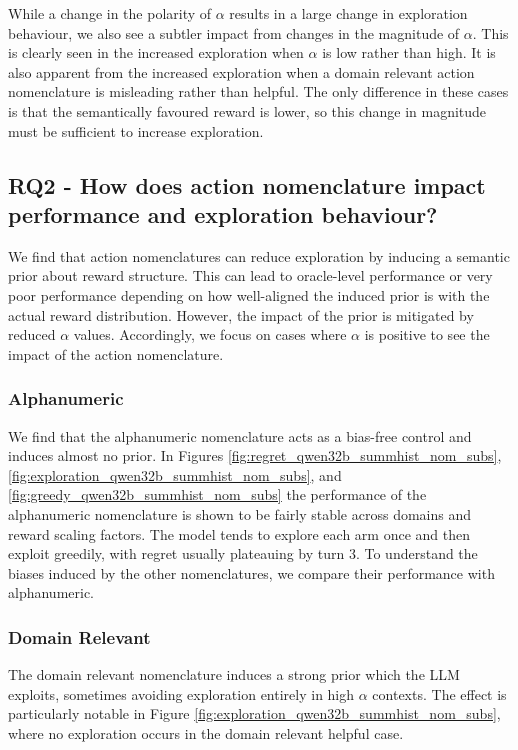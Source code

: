 \documentclass{article} %
\begin{document}
While a change in the polarity of $\alpha$ results in a large change in exploration behaviour, we also see a subtler impact from changes in the magnitude of $\alpha$. This is clearly seen in the increased exploration when $\alpha$ is low rather than high. It is also apparent from the increased exploration when a domain relevant action nomenclature is misleading rather than helpful. The only difference in these cases is that the semantically favoured reward is lower, so this change in magnitude must be sufficient to increase exploration.

\subsection*{RQ2 - How does action nomenclature impact performance and exploration behaviour?}
We find that action nomenclatures can reduce exploration by inducing a semantic prior about reward structure. This can lead to oracle-level performance or very poor performance depending on how well-aligned the induced prior is with the actual reward distribution. However, the impact of the prior is mitigated by reduced $\alpha$ values. Accordingly, we focus on cases where $\alpha$ is positive to see the impact of the action nomenclature.

\subsubsection*{Alphanumeric} 
We find that the alphanumeric nomenclature acts as a bias-free control and induces almost no prior. In Figures \ref{fig:regret_qwen32b_summhist_nom_subs}, \ref{fig:exploration_qwen32b_summhist_nom_subs}, and \ref{fig:greedy_qwen32b_summhist_nom_subs} the performance of the alphanumeric nomenclature is shown to be fairly stable across domains and reward scaling factors. The model tends to explore each arm once and then exploit greedily, with regret usually plateauing by turn 3. To understand the biases induced by the other nomenclatures, we compare their performance with alphanumeric.

\subsubsection*{Domain Relevant}
The domain relevant nomenclature induces a strong prior which the LLM exploits, sometimes avoiding exploration entirely in high $\alpha$ contexts. The effect is particularly notable in Figure \ref{fig:exploration_qwen32b_summhist_nom_subs}, where no exploration occurs in the domain relevant helpful case. 
\end{document}
